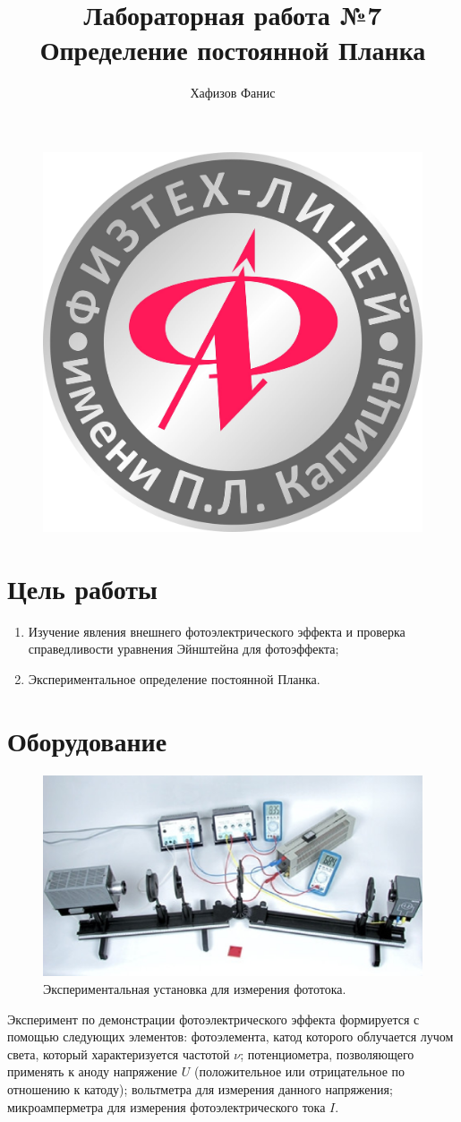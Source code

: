 \documentclass[12pt]{article}
\title{Лабораторная работа №7\\
		Определение постоянной Планка}
\author{Хафизов Фанис}
\begin{document}
	\begin{figure}
		\centering
		\includegraphics[width=0.3\linewidth]{logo}
	\end{figure}
	\maketitle
	\newpage
	\section{Цель работы}
	\begin{enumerate}
		\item
		Изучение явления внешнего фотоэлектрического эффекта и проверка справедливости уравнения Эйнштейна для фотоэффекта;
		\item
		Экспериментальное определение постоянной Планка.
	\end{enumerate}
	\section{Оборудование}
	\begin{figure}[H]
		\centering
		\includegraphics[width=\linewidth]{scheme}
		\caption{Экспериментальная установка для измерения фототока.}
	\end{figure}
	Эксперимент по демонстрации фотоэлектрического эффекта формируется с помощью следующих элементов: фотоэлемента, катод которого облучается лучом света, который характеризуется частотой $\nu$; потенциометра, позволяющего применять к аноду напряжение $U$ (положительное или отрицательное по отношению к катоду); вольтметра для измерения данного напряжения; микроамперметра для измерения фотоэлектрического тока $I$.
\end{document}
